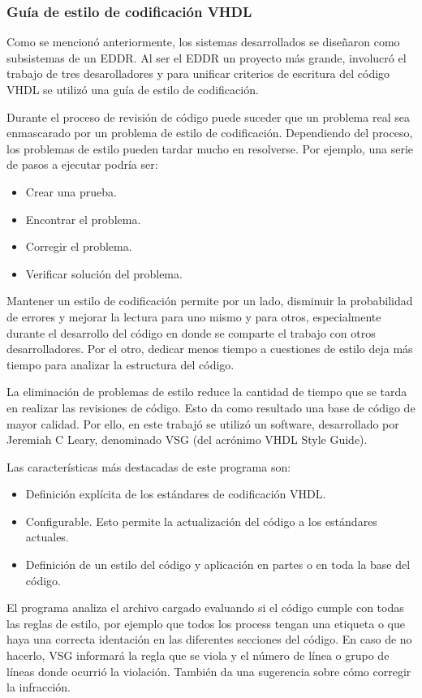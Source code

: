 \subsubsection{Guía de estilo de codificación VHDL}
Como se mencionó anteriormente, los sistemas desarrollados se diseñaron como subsistemas de un EDDR. Al ser el EDDR un proyecto más grande, involucró el trabajo de tres desarolladores y para unificar criterios de escritura del código VHDL se utilizó una guía de estilo de codificación.

Durante el proceso de revisión de código puede suceder que un problema real sea enmascarado por un problema de estilo de codificación. Dependiendo del proceso, los problemas de estilo pueden tardar mucho en resolverse. Por ejemplo, una serie de pasos a ejecutar podría ser:

\begin{itemize}
\item Crear una prueba.
\item Encontrar el problema.
\item Corregir el problema.
\item Verificar solución del problema.

\end{itemize}

Mantener un estilo de codificación permite por un lado, disminuir la probabilidad de errores y mejorar la lectura para uno mismo y para otros, especialmente durante el desarrollo del código en donde se comparte el trabajo con otros desarrolladores. Por el otro, dedicar menos tiempo a cuestiones de estilo deja más tiempo para analizar la estructura del código.

La eliminación de problemas de estilo reduce la cantidad de tiempo que se tarda en realizar las revisiones de código. Esto da como resultado una base de código de mayor calidad. Por ello, en este trabajó se utilizó un software, desarrollado por Jeremiah C Leary, denominado VSG (del acrónimo VHDL Style Guide).

Las características más destacadas de este programa son:
\begin{itemize}
\item
Definición explícita de los estándares de codificación VHDL.
\item
Configurable. Esto permite la actualización del código a los estándares actuales.
\item
Definición de un estilo del código y aplicación en partes o en toda la base del código.
\end{itemize}
El programa analiza el archivo cargado evaluando si el código cumple con todas las reglas de estilo, por ejemplo que todos los process tengan una etiqueta o que haya una correcta identación en las diferentes secciones del código. En caso de no hacerlo, VSG informará la regla que se viola y el número de línea o grupo de líneas donde ocurrió la violación. También da una sugerencia sobre cómo corregir la infracción.

